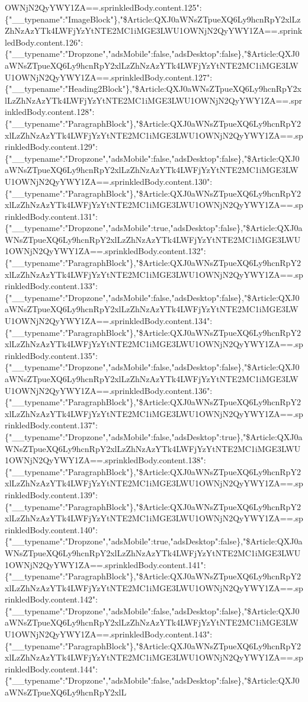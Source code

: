 OWNjN2QyYWY1ZA==.sprinkledBody.content.125":\{"\_\_typename":"ImageBlock"\},"\$Article:QXJ0aWNsZTpueXQ6Ly9hcnRpY2xlLzZhNzAzYTk4LWFjYzYtNTE2MC1iMGE3LWU1OWNjN2QyYWY1ZA==.sprinkledBody.content.126":\{"\_\_typename":"Dropzone","adsMobile":false,"adsDesktop":false\},"\$Article:QXJ0aWNsZTpueXQ6Ly9hcnRpY2xlLzZhNzAzYTk4LWFjYzYtNTE2MC1iMGE3LWU1OWNjN2QyYWY1ZA==.sprinkledBody.content.127":\{"\_\_typename":"Heading2Block"\},"\$Article:QXJ0aWNsZTpueXQ6Ly9hcnRpY2xlLzZhNzAzYTk4LWFjYzYtNTE2MC1iMGE3LWU1OWNjN2QyYWY1ZA==.sprinkledBody.content.128":\{"\_\_typename":"ParagraphBlock"\},"\$Article:QXJ0aWNsZTpueXQ6Ly9hcnRpY2xlLzZhNzAzYTk4LWFjYzYtNTE2MC1iMGE3LWU1OWNjN2QyYWY1ZA==.sprinkledBody.content.129":\{"\_\_typename":"Dropzone","adsMobile":false,"adsDesktop":false\},"\$Article:QXJ0aWNsZTpueXQ6Ly9hcnRpY2xlLzZhNzAzYTk4LWFjYzYtNTE2MC1iMGE3LWU1OWNjN2QyYWY1ZA==.sprinkledBody.content.130":\{"\_\_typename":"ParagraphBlock"\},"\$Article:QXJ0aWNsZTpueXQ6Ly9hcnRpY2xlLzZhNzAzYTk4LWFjYzYtNTE2MC1iMGE3LWU1OWNjN2QyYWY1ZA==.sprinkledBody.content.131":\{"\_\_typename":"Dropzone","adsMobile":true,"adsDesktop":false\},"\$Article:QXJ0aWNsZTpueXQ6Ly9hcnRpY2xlLzZhNzAzYTk4LWFjYzYtNTE2MC1iMGE3LWU1OWNjN2QyYWY1ZA==.sprinkledBody.content.132":\{"\_\_typename":"ParagraphBlock"\},"\$Article:QXJ0aWNsZTpueXQ6Ly9hcnRpY2xlLzZhNzAzYTk4LWFjYzYtNTE2MC1iMGE3LWU1OWNjN2QyYWY1ZA==.sprinkledBody.content.133":\{"\_\_typename":"Dropzone","adsMobile":false,"adsDesktop":false\},"\$Article:QXJ0aWNsZTpueXQ6Ly9hcnRpY2xlLzZhNzAzYTk4LWFjYzYtNTE2MC1iMGE3LWU1OWNjN2QyYWY1ZA==.sprinkledBody.content.134":\{"\_\_typename":"ParagraphBlock"\},"\$Article:QXJ0aWNsZTpueXQ6Ly9hcnRpY2xlLzZhNzAzYTk4LWFjYzYtNTE2MC1iMGE3LWU1OWNjN2QyYWY1ZA==.sprinkledBody.content.135":\{"\_\_typename":"Dropzone","adsMobile":false,"adsDesktop":false\},"\$Article:QXJ0aWNsZTpueXQ6Ly9hcnRpY2xlLzZhNzAzYTk4LWFjYzYtNTE2MC1iMGE3LWU1OWNjN2QyYWY1ZA==.sprinkledBody.content.136":\{"\_\_typename":"ParagraphBlock"\},"\$Article:QXJ0aWNsZTpueXQ6Ly9hcnRpY2xlLzZhNzAzYTk4LWFjYzYtNTE2MC1iMGE3LWU1OWNjN2QyYWY1ZA==.sprinkledBody.content.137":\{"\_\_typename":"Dropzone","adsMobile":false,"adsDesktop":true\},"\$Article:QXJ0aWNsZTpueXQ6Ly9hcnRpY2xlLzZhNzAzYTk4LWFjYzYtNTE2MC1iMGE3LWU1OWNjN2QyYWY1ZA==.sprinkledBody.content.138":\{"\_\_typename":"ParagraphBlock"\},"\$Article:QXJ0aWNsZTpueXQ6Ly9hcnRpY2xlLzZhNzAzYTk4LWFjYzYtNTE2MC1iMGE3LWU1OWNjN2QyYWY1ZA==.sprinkledBody.content.139":\{"\_\_typename":"ParagraphBlock"\},"\$Article:QXJ0aWNsZTpueXQ6Ly9hcnRpY2xlLzZhNzAzYTk4LWFjYzYtNTE2MC1iMGE3LWU1OWNjN2QyYWY1ZA==.sprinkledBody.content.140":\{"\_\_typename":"Dropzone","adsMobile":true,"adsDesktop":false\},"\$Article:QXJ0aWNsZTpueXQ6Ly9hcnRpY2xlLzZhNzAzYTk4LWFjYzYtNTE2MC1iMGE3LWU1OWNjN2QyYWY1ZA==.sprinkledBody.content.141":\{"\_\_typename":"ParagraphBlock"\},"\$Article:QXJ0aWNsZTpueXQ6Ly9hcnRpY2xlLzZhNzAzYTk4LWFjYzYtNTE2MC1iMGE3LWU1OWNjN2QyYWY1ZA==.sprinkledBody.content.142":\{"\_\_typename":"Dropzone","adsMobile":false,"adsDesktop":false\},"\$Article:QXJ0aWNsZTpueXQ6Ly9hcnRpY2xlLzZhNzAzYTk4LWFjYzYtNTE2MC1iMGE3LWU1OWNjN2QyYWY1ZA==.sprinkledBody.content.143":\{"\_\_typename":"ParagraphBlock"\},"\$Article:QXJ0aWNsZTpueXQ6Ly9hcnRpY2xlLzZhNzAzYTk4LWFjYzYtNTE2MC1iMGE3LWU1OWNjN2QyYWY1ZA==.sprinkledBody.content.144":\{"\_\_typename":"Dropzone","adsMobile":false,"adsDesktop":false\},"\$Article:QXJ0aWNsZTpueXQ6Ly9hcnRpY2xlL
